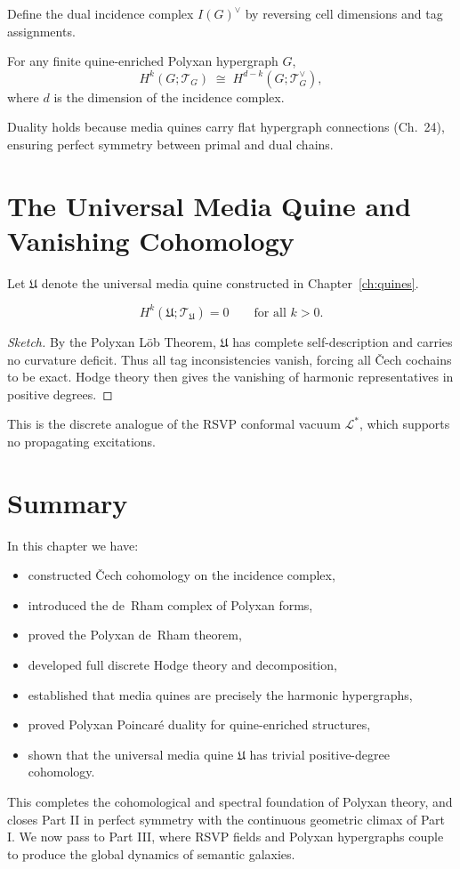 Define the dual incidence complex $I(G)^\vee$ by reversing cell dimensions
and tag assignments.

\begin{theorem}
For any finite quine-enriched Polyxan hypergraph $G$,
\[
H^k(G;\mathscr{T}_G)
   \;\cong\;
H^{d-k}(G;\mathscr{T}_G^\vee),
\]
where $d$ is the dimension of the incidence complex.
\end{theorem}

Duality holds because media quines carry flat hypergraph connections (Ch.~24),
ensuring perfect symmetry between primal and dual chains.

\section{The Universal Media Quine and Vanishing Cohomology}

Let $\mathfrak{U}$ denote the universal media quine constructed in
Chapter~\ref{ch:quines}.  

\begin{theorem}
\[
H^k(\mathfrak{U};\mathscr{T}_{\mathfrak{U}})=0
\qquad\text{for all }k>0.
\]
\end{theorem}

\begin{proof}[Sketch]
By the Polyxan Löb Theorem, $\mathfrak{U}$ has complete self-description and
carries no curvature deficit.  
Thus all tag inconsistencies vanish, forcing all Čech cochains to be exact.
Hodge theory then gives the vanishing of harmonic representatives in positive
degrees.
\end{proof}

This is the discrete analogue of the RSVP conformal vacuum $\mathcal{L}^\ast$,
which supports no propagating excitations.

\section{Summary}

In this chapter we have:

\begin{itemize}
\item constructed Čech cohomology on the incidence complex,
\item introduced the de~Rham complex of Polyxan forms,
\item proved the Polyxan de~Rham theorem,
\item developed full discrete Hodge theory and decomposition,
\item established that media quines are precisely the harmonic hypergraphs,
\item proved Polyxan Poincaré duality for quine-enriched structures,
\item shown that the universal media quine $\mathfrak{U}$ has trivial positive-degree cohomology.
\end{itemize}

This completes the cohomological and spectral foundation of Polyxan theory,  
and closes Part II in perfect symmetry with the continuous geometric climax
of Part I.  
We now pass to Part III, where RSVP fields and Polyxan hypergraphs couple to
produce the global dynamics of semantic galaxies.
